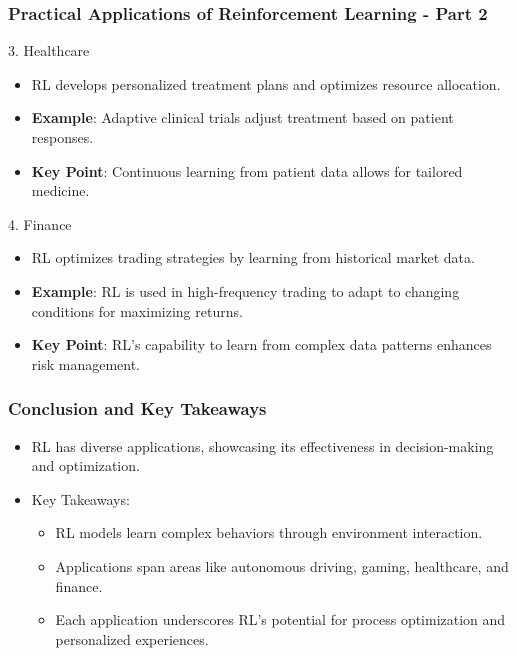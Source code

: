 \documentclass[aspectratio=169]{beamer}
\begin{document}
\begin{frame}[fragile]
    \frametitle{Practical Applications of Reinforcement Learning - Part 2}
    \begin{block}{3. Healthcare}
        \begin{itemize}
            \item RL develops personalized treatment plans and optimizes resource allocation.
            \item \textbf{Example}: Adaptive clinical trials adjust treatment based on patient responses.
            \item \textbf{Key Point}: Continuous learning from patient data allows for tailored medicine.
        \end{itemize}
    \end{block}
    
    \begin{block}{4. Finance}
        \begin{itemize}
            \item RL optimizes trading strategies by learning from historical market data.
            \item \textbf{Example}: RL is used in high-frequency trading to adapt to changing conditions for maximizing returns.
            \item \textbf{Key Point}: RL’s capability to learn from complex data patterns enhances risk management.
        \end{itemize}
    \end{block}
\end{frame}

\begin{frame}[fragile]
    \frametitle{Conclusion and Key Takeaways}
    \begin{itemize}
        \item RL has diverse applications, showcasing its effectiveness in decision-making and optimization.
        \item Key Takeaways:
        \begin{itemize}
            \item RL models learn complex behaviors through environment interaction.
            \item Applications span areas like autonomous driving, gaming, healthcare, and finance.
            \item Each application underscores RL's potential for process optimization and personalized experiences.
        \end{itemize}
    \end{itemize}
\end{frame}
\end{document}
